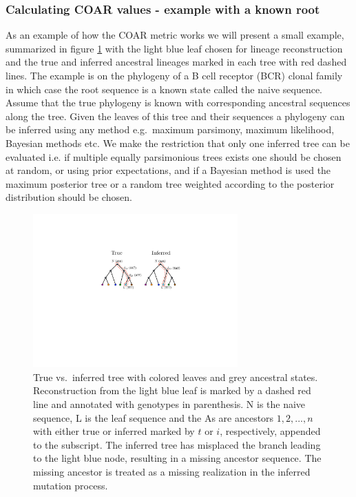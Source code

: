 \subsubsection{Calculating COAR values - example with a known root}
As an example of how the COAR metric works we will present a small example, summarized in figure \ref{fig:ASR_true_vs_inferred} with the light blue leaf chosen for lineage reconstruction and the true and inferred ancestral lineages marked in each tree with red dashed lines.
The example is on the phylogeny of a B cell receptor (BCR) clonal family in which case the root sequence is a known state called the naive sequence.
Assume that the true phylogeny is known with corresponding ancestral sequences along the tree.
Given the leaves of this tree and their sequences a phylogeny can be inferred using any method e.g.\ maximum parsimony, maximum likelihood, Bayesian methods etc.
We make the restriction that only one inferred tree can be evaluated i.e. if multiple equally parsimonious trees exists one should be chosen at random, or using prior expectations, and if a Bayesian method is used the maximum posterior tree or a random tree weighted according to the posterior distribution should be chosen.

\begin{figure}[ht!]
    \centering
    \includegraphics[width=0.7\textwidth]{figures/ASR_true_vs_inferred.pdf}
    \caption{
        \label{fig:ASR_true_vs_inferred}
        True vs.\ inferred tree with colored leaves and grey ancestral states. Reconstruction from the light blue leaf is marked by a dashed red line and annotated with genotypes in parenthesis. N is the naive sequence, L is the leaf sequence and the As are ancestors $1,2,...,n$ with either true or inferred marked by $t$ or $i$, respectively, appended to the subscript. The inferred tree has misplaced the branch leading to the light blue node, resulting in a missing ancestor sequence. The missing ancestor is treated as a missing realization in the inferred mutation process.
    }
\end{figure}

